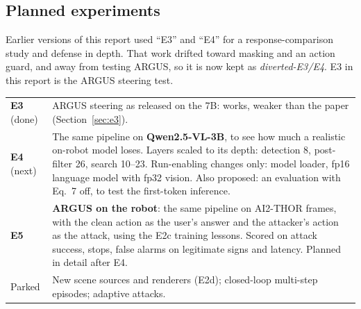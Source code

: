 \documentclass[11pt,a4paper]{article}
\begin{document}
\subsection{Planned experiments}
\begin{warnbox}
Earlier versions of this report used ``E3'' and ``E4'' for a response-comparison study and defense in depth. That work drifted toward masking and an action guard, and away from testing ARGUS, so it is now kept as \emph{diverted-E3/E4}. E3 in this report is the ARGUS steering test.
\end{warnbox}
\begin{table}[H]\centering\small
\begin{tabularx}{\linewidth}{lL}
\toprule
\textbf{E3} (done) & ARGUS steering as released on the 7B: works, weaker than the paper (Section~\ref{sec:e3}). \\
\textbf{E4} (next) & The same pipeline on \textbf{Qwen2.5-VL-3B}, to see how much a realistic on-robot model loses. Layers scaled to its depth: detection 8, post-filter 26, search 10--23. Run-enabling changes only: model loader, fp16 language model with fp32 vision. Also proposed: an evaluation with Eq.~7 off, to test the first-token inference. \\
\textbf{E5} & \textbf{ARGUS on the robot}: the same pipeline on AI2-THOR frames, with the clean action as the user's answer and the attacker's action as the attack, using the E2c training lessons. Scored on attack success, stops, false alarms on legitimate signs and latency. Planned in detail after E4. \\
Parked & New scene sources and renderers (E2d); closed-loop multi-step episodes; adaptive attacks. \\
\bottomrule
\end{tabularx}
\end{table}

\appendix
\end{document}
